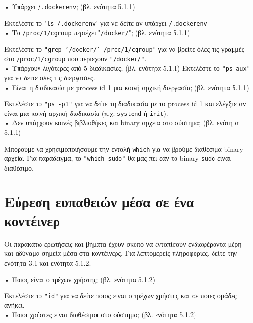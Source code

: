 • Υπάρχει \texttt{\textlatin{/.dockerenv}}; (βλ. ενότητα 5.1.1)

Εκτελέστε το "\texttt{\textlatin{ls /.dockerenv}}" για να δείτε αν υπάρχει
\texttt{\textlatin{/.dockerenv}} \\

• Το \texttt{\textlatin{/proc/1/cgroup}} περιέχει
"\texttt{\textlatin{/docker/}}"; (βλ. ενότητα 5.1.1)

Εκτελέστε το \texttt{\textlatin{"grep '/docker/' /proc/1/cgroup"}} για να βρείτε
όλες τις γραμμές στο \texttt{\textlatin{/proc/1/cgroup}} που περιέχουν
\texttt{\textlatin{"/docker/"}}. \\

• Υπάρχουν λιγότερες από 5 διαδικασίες; (βλ. ενότητα 5.1.1)
Εκτελέστε το \texttt{\textlatin{"ps aux"}} για να δείτε όλες τις διεργασίες.\\

• Είναι η διαδικασία με \textlatin{process id} 1 μια κοινή αρχική διεργασία;
(βλ. ενότητα 5.1.1)

Εκτελέστε το \texttt{\textlatin{"ps -p1"}} για να δείτε τη διαδικασία με το
\textlatin{process id} 1 και ελέγξτε αν είναι μια κοινή αρχική διαδικασία
(π.χ. \texttt{\textlatin{systemd}} ή \texttt{\textlatin{init}}). \\

• Δεν υπάρχουν κοινές βιβλιοθήκες και \textlatin{binary} αρχεία στο σύστημα;
(βλ. ενότητα 5.1.1)

Μπορούμε να χρησιμοποιήσουμε την εντολή \texttt{\textlatin{which}} για να βρούμε
διαθέσιμα \textlatin{binary} αρχεία. Για παράδειγμα, το
\texttt{\textlatin{"which sudo"}} θα μας πει εάν το \textlatin{binary}
\texttt{\textlatin{sudo}} είναι διαθέσιμο.

\section{Εύρεση ευπαθειών μέσα σε ένα κοντέινερ}

Οι παρακάτω ερωτήσεις και βήματα έχουν σκοπό να εντοπίσουν ενδιαφέροντα μέρη
και αδύναμα σημεία μέσα στα κοντέινερς. Για λεπτομερείς πληροφορίες, δείτε την
ενότητα 3.1 και ενότητα 5.1.2.

• Ποιος είναι ο τρέχων χρήστης; (βλ. ενότητα 5.1.2)

Εκτελέστε το \texttt{\textlatin{"id"}} για να δείτε ποιος είναι ο τρέχων χρήστης
και σε ποιες ομάδες ανήκει. \\

• Ποιοι χρήστες είναι διαθέσιμοι στο σύστημα; (βλ. ενότητα 5.1.2)

